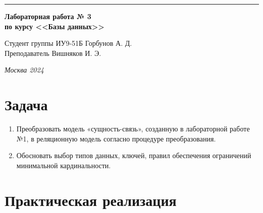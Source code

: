 \documentclass[a4paper, 14pt]{extarticle}
\begin{document}
\begin{titlepage}
\vspace*{-16pt}
\hspace{30pt}\rule{0.866\textwidth}{0.4pt}
  
\vspace{11em}

\begin{center}
\Large {\bf Лабораторная работа № 3} \\ 
\large {\bf по курсу <<Базы данных>>}\\
\end{center}\normalsize

\vspace{8em}


\begin{flushright}
  {Студент группы ИУ9-51Б Горбунов А. Д.\hspace*{15pt} \\
  \vspace{2ex}
  Преподаватель Вишняков И. Э.\hspace*{15pt}}
\end{flushright}

\bigskip

\vfill
 

\begin{center}
\textsl{Москва 2024}
\end{center}
\end{titlepage}

\renewcommand{\ttdefault}{pcr}

\setlength{\tabcolsep}{3pt}
\newpage
\setcounter{page}{2}

\section{Задача}\label{Sect::task}
\par

\begin{enumerate}
    \item Преобразовать модель «сущность-связь», созданную в лабораторной работе №1, в реляционную модель согласно процедуре преобразования.
    \item Обосновать выбор типов данных, ключей, правил обеспечения ограничений минимальной кардинальности.
\end{enumerate}

\par

\section{Практическая реализация}\label{Sect::task}
\end{document}
